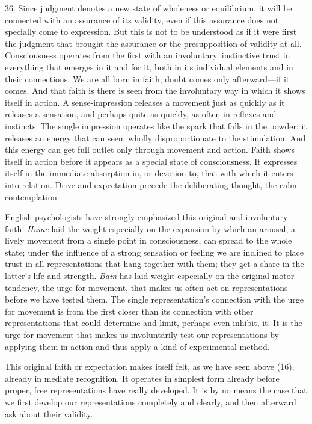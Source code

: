 \documentclass[12pt,a4paper]{book}
\newcommand{\opage}[1]{\marginnote{\footnotesize\textit{[#1]}}}
\begin{document}
36. Since judgment denotes a new state of wholeness or equilibrium, it
will be connected with an assurance of its validity, even if this
assurance does not specially come to expression. But this is not to be
understood as if it were first the judgment that brought the assurance or
the presupposition of validity at all. Consciousness operates from the
first with an involuntary, instinctive trust in everything that emerges in
it and for it, both in its individual elements and in their connections.
We are all born in faith; doubt comes only afterward---if it comes. And
that faith is there is seen from the involuntary way in which it shows
itself in action. A sense-impression releases a movement just as quickly
as it releases a sensation, and perhaps quite as quickly, as often in
reflexes and instincts. The single impression operates like the spark that
falls in the powder; it releases an energy that can seem wholly
disproportionate to the stimulation. And this energy can get full outlet
only through movement and action. Faith shows itself in action before it
appears as a special state of consciousness. It expresses itself in the
immediate absorption in, or devotion to, that with which it enters into
relation. Drive and expectation precede the deliberating thought, the calm
contemplation.

English psychologists have strongly emphasized this original and
involuntary faith. \emph{Hume} laid the weight especially on \opage{100}the expansion
by which an arousal, a lively movement from a single point in
consciousness, can spread to the whole state; under the influence of a
strong sensation or feeling we are inclined to place trust in all
representations that hang together with them; they get a share in the
latter's life and strength. \emph{Bain} has laid weight especially on the
original motor tendency, the urge for movement, that makes us often act on
representations before we have tested them. The single representation's
connection with the urge for movement is from the first closer than its
connection with other representations that could determine and limit,
perhaps even inhibit, it. It is the urge for movement that makes us
involuntarily test our representations by applying them in action and thus
apply a kind of experimental method.

This original faith or expectation makes itself felt, as we have seen
above (16), already in mediate recognition. It operates in simplest form
already before proper, free representations have really developed. It is by
no means the case that we first develop our representations completely and
clearly, and then afterward ask about their validity.
\end{document}
